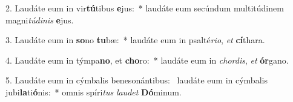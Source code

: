 2. Laudáte eum in vir\textbf{tú}tibus \textbf{e}jus:~*  laudáte eum secúndum multitúdinem magni\textit{tú}\textit{di}\textit{nis} \textbf{e}jus.\

3. Laudáte eum in \textbf{so}no \textbf{tu}bæ:~*  laudáte eum in psalté\textit{ri}\textit{o}, \textit{et} \textbf{cí}thara.\

4. Laudáte eum in týmpa\textbf{no}, et \textbf{cho}ro:~*  laudáte eum in \textit{chor}\textit{dis}, \textit{et} \textbf{ór}gano.\

5. Laudáte eum in cýmbalis benesonántibus: \dag\  laudáte eum in cýmbalis jubi\textbf{la}ti\textbf{ó}nis:~*  omnis spíri\textit{tus} \textit{lau}\textit{det} \textbf{Dó}minum.\

